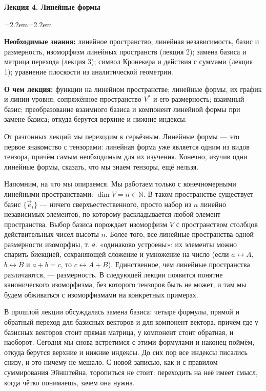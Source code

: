 \documentclass[11pt,a4paper]{article}
\newenvironment{lectureabout}{\begin{list}{}{\leftmargin=2.2em\rightmargin=2.2em}\small\item[]}{\end{list}\medskip}
\begin{document}
\begin{center}
  {\Large\bfseries Лекция 4. Линейные формы}
\end{center}
\medskip

\begin{lectureabout}
\textbf{Необходимые знания:} линейное пространство, линейная независимость, базис и размерность, изоморфизм линейных пространств (лекция 2); замена базиса и матрица перехода (лекция 3); символ Кронекера и действия с суммами (лекция 1); уравнение плоскости из аналитической геометрии.

\smallskip
\textbf{О чем лекция:} функции на линейном пространстве; линейные формы, их график и линии уровня; сопряжённое пространство $V^*$ и его размерность; взаимный базис; преобразование взаимного базиса и компонент линейной формы при замене базиса; откуда берутся верхние и нижние индексы.
\end{lectureabout}

От разгонных лекций мы переходим к серьёзным. Линейные формы — это первое знакомство с тензорами: линейная форма уже является одним из видов тензора, причём самым необходимым для их изучения. Конечно, изучив одни линейные формы, сказать, что мы знаем тензоры, ещё нельзя.

Напомним, на что мы опираемся. Мы работаем только с конечномерными линейными пространствами: $\dim V = n \in \mathbb{N}$. В таком пространстве существует базис $\{\vec e_i\}$ — ничего сверхъестественного, просто набор из $n$ линейно независимых элементов, по которому раскладывается любой элемент пространства. Выбор базиса порождает изоморфизм $V$ с пространством столбцов действительных чисел высоты $n$. Более того, все линейные пространства одной размерности изоморфны, т. е. «одинаково устроены»: их элементы можно спарить биекцией, сохраняющей сложение и умножение на число (если $a \leftrightarrow A$, $b \leftrightarrow B$ и $a + b = c$, то $c \leftrightarrow A + B$). Единственное, чем линейные пространства различаются, — размерность. В следующей лекции появится понятие канонического изоморфизма, без которого тензоров быть не может, и там мы будем обживаться с изоморфизмами на конкретных примерах.

В прошлой лекции обсуждалась замена базиса: четыре формулы, прямой и обратный переход для базисных векторов и для компонент вектора, причём где у базисных векторов стоит прямая матрица, у компонент стоит обратная, и наоборот. Сегодня мы снова встретимся с этими формулами и наконец поймём, откуда берутся верхние и нижние индексы. До сих пор все индексы писались снизу, и это ничему не мешало. С новой записью, как и с правилом суммирования Эйнштейна, торопиться не стоит: переходить на неё имеет смысл, когда чётко понимаешь, зачем она нужна.
\end{document}

